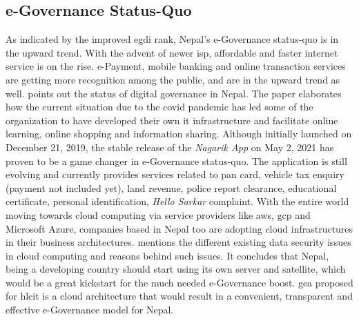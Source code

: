 \documentclass{home_assignment}
\newcommand\Myciteauthor[1]{\citeauthor{#1} \cite{#1}}
\begin{document}
    \subsection{e-Governance Status-Quo}
    As indicated by the improved \acrshort{egdi} rank, Nepal's e-Governance status-quo is in the upward trend. With the advent of newer \acrshort{isp}, affordable and faster internet service is on the rise. e-Payment, mobile banking and online transaction services are getting more recognition among the public, and are in the upward trend as well. \Myciteauthor{gajendra2020} points out the status of digital governance in Nepal. The paper elaborates how the current situation due to the \acrshort{covid} pandemic has led some of the organization to have developed their own \acrshort{it} infrastructure and facilitate online learning, online shopping and information sharing. Although initially launched on December 21, 2019, the stable release of the \textit{Nagarik App} on May 2, 2021 has proven to be a game changer in e-Governance status-quo. The application is still evolving and currently provides services related to \acrfull{pan} card, vehicle tax enquiry (payment not included yet), land revenue, police report clearance, educational certificate, personal identification, \textit{Hello Sarkar} complaint. With the entire world moving towards cloud computing via service providers like \acrfull{aws}, \acrfull{gcp} and Microsoft Azure, companies based in Nepal too are adopting cloud infrastructures in their business architectures. \Myciteauthor{giri-cloud} mentions the different existing data security issues in cloud computing and reasons behind such issues. It concludes that Nepal, being a developing country should start using its own server and satellite, which would be a great kickstart for the much needed e-Governance boost. \acrfull{gea} proposed for \acrshort{hlcit} is a cloud architecture that would result in a convenient, transparent and effective e-Governance model for Nepal. 
    \clearpage
    \printbibliography[heading=bibintoc,title={Bibliography}]
\end{document}
